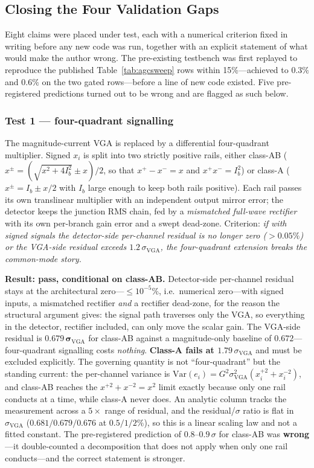 \documentclass[11pt]{article}
\begin{document}
\subsection{Closing the Four Validation Gaps}
\label{sec:gaps}

Eight claims were placed under test, each with a numerical criterion fixed in writing before any new code was run, together with an explicit statement of what would make the author wrong. The pre-existing testbench was first replayed to reproduce the published Table~\ref{tab:agcsweep} rows within 15\%---achieved to $0.3\%$ and $0.6\%$ on the two gated rows---before a line of new code existed. Five pre-registered predictions turned out to be wrong and are flagged as such below.

\subsubsection{Test 1 --- four-quadrant signalling}

The magnitude-current VGA is replaced by a differential four-quadrant multiplier. Signed $x_i$ is split into two strictly positive rails, either class-AB ($x^\pm = (\sqrt{x^2+4I_b^2}\pm x)/2$, so that $x^+ - x^- = x$ and $x^+x^- = I_b^2$) or class-A ($x^\pm = I_b \pm x/2$ with $I_b$ large enough to keep both rails positive). Each rail passes its own translinear multiplier with an independent output mirror error; the detector keeps the junction RMS chain, fed by a \textit{mismatched full-wave rectifier} with its own per-branch gain error and a swept dead-zone. Criterion: \textit{if with signed signals the detector-side per-channel residual is no longer zero ($>0.05\%$) or the VGA-side residual exceeds $1.2\,\sigma_{\mathrm{VGA}}$, the four-quadrant extension breaks the common-mode story.}

\textbf{Result: pass, conditional on class-AB.} Detector-side per-channel residual stays at the architectural zero---$\le 10^{-5}\%$, i.e.\ numerical zero---with signed inputs, a mismatched rectifier \textit{and} a rectifier dead-zone, for the reason the structural argument gives: the signal path traverses only the VGA, so everything in the detector, rectifier included, can only move the scalar gain. The VGA-side residual is $\mathbf{0.679\,\sigma_{\mathrm{VGA}}}$ for class-AB against a magnitude-only baseline of $0.672$---four-quadrant signalling costs \textit{nothing}. \textbf{Class-A fails at $1.79\,\sigma_{\mathrm{VGA}}$} and must be excluded explicitly. The governing quantity is not ``four-quadrant'' but the standing current: the per-channel variance is $\mathrm{Var}(e_i) = G^2\sigma^2_{\mathrm{VGA}}(x_i^{+2} + x_i^{-2})$, and class-AB reaches the $x^{+2}+x^{-2} = x^2$ limit exactly because only one rail conducts at a time, while class-A never does. An analytic column tracks the measurement across a $5\times$ range of residual, and the residual/$\sigma$ ratio is flat in $\sigma_{\mathrm{VGA}}$ ($0.681/0.679/0.676$ at $0.5/1/2\%$), so this is a linear scaling law and not a fitted constant. The pre-registered prediction of $0.8$--$0.9\,\sigma$ for class-AB was \textbf{wrong}---it double-counted a decomposition that does not apply when only one rail conducts---and the correct statement is stronger.
\end{document}
